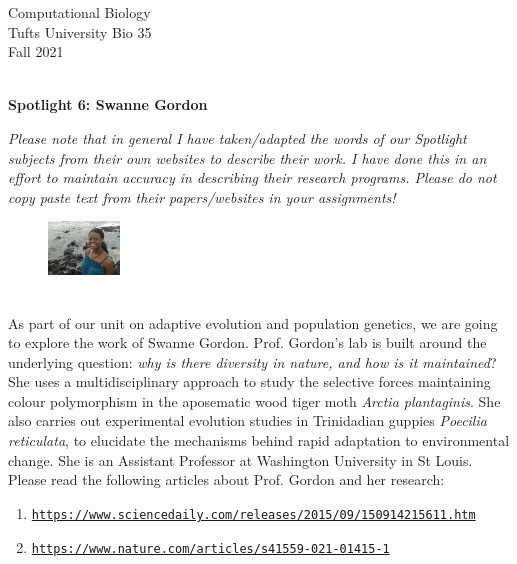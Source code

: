 \documentclass{article}
\begin{document}
\BeginAccSupp{}
\begin{flushright}
Computational Biology ~\\
Tufts University Bio 35 ~\\
Fall 2021 ~\\ ~\\
\end{flushright}
\begin{center}{\textbf{\Large{Spotlight 6: Swanne Gordon}}}\end{center}

\textit{Please note that in general I have taken/adapted the words of our Spotlight subjects from their own websites to describe their work. I have done this in an effort to maintain accuracy in describing their research programs. Please do not copy paste text from their papers/websites in your assignments!}

\begin{figure}
\begin{center}
 \includegraphics[width=0.17\textwidth]{images/swanne-gordon.jpeg}
 \end{center}
\end{figure}
~\\ As part of our unit on adaptive evolution and population genetics, we are going to explore the work of Swanne Gordon. Prof. Gordon's lab is built around the underlying question: \textit{why is there diversity in nature, and how is it maintained}? She uses a multidisciplinary approach to study the selective forces maintaining colour polymorphism in the aposematic wood tiger moth \textit{Arctia plantaginis}. She also carries out experimental evolution studies in Trinidadian guppies \textit{Poecilia reticulata}, to elucidate the mechanisms behind rapid adaptation to environmental change. She is an Assistant Professor at Washington University in St Louis.
~\\

Please read the following articles about Prof. Gordon and her research: 
\begin{enumerate}
\item \texttt{\href{https://www.sciencedaily.com/releases/2015/09/150914215611.htm}{https://www.sciencedaily.com/releases/2015/09/150914215611.htm}}
\item \texttt{\href{https://www.nature.com/articles/s41559-021-01415-1}{https://www.nature.com/articles/s41559-021-01415-1}}
\end{enumerate}
\end{document}
